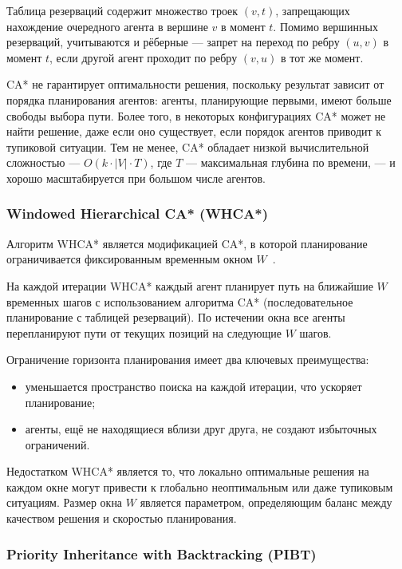 Таблица резерваций содержит множество троек $(v, t)$, запрещающих нахождение очередного агента в вершине $v$ в момент $t$. Помимо вершинных резерваций, учитываются и рёберные --- запрет на переход по ребру $(u, v)$ в момент $t$, если другой агент проходит по ребру $(v, u)$ в тот же момент.

CA* не гарантирует оптимальности решения, поскольку результат зависит от порядка планирования агентов: агенты, планирующие первыми, имеют больше свободы выбора пути. Более того, в некоторых конфигурациях CA* может не найти решение, даже если оно существует, если порядок агентов приводит к тупиковой ситуации. Тем не менее, CA* обладает низкой вычислительной сложностью --- $O(k \cdot |V| \cdot T)$, где $T$ --- максимальная глубина по времени, --- и хорошо масштабируется при большом числе агентов.

\subsubsection{Windowed Hierarchical CA* (WHCA*)}

Алгоритм WHCA* является модификацией CA*, в которой планирование ограничивается фиксированным временным окном $W$~\cite{silver2005cooperative}.

На каждой итерации WHCA* каждый агент планирует путь на ближайшие $W$ временных шагов с использованием алгоритма CA* (последовательное планирование с таблицей резерваций). По истечении окна все агенты перепланируют пути от текущих позиций на следующие $W$ шагов.

Ограничение горизонта планирования имеет два ключевых преимущества:
\begin{itemize}
    \item уменьшается пространство поиска на каждой итерации, что ускоряет планирование;
    \item агенты, ещё не находящиеся вблизи друг друга, не создают избыточных ограничений.
\end{itemize}

Недостатком WHCA* является то, что локально оптимальные решения на каждом окне могут привести к глобально неоптимальным или даже тупиковым ситуациям. Размер окна $W$ является параметром, определяющим баланс между качеством решения и скоростью планирования.

\subsubsection{Priority Inheritance with Backtracking (PIBT)}

